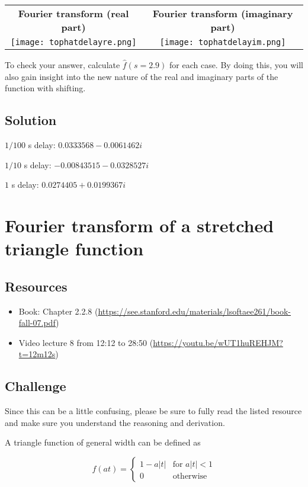\begin{tabular}{cc}
    \textbf{Fourier transform (real part)} & \textbf{Fourier transform (imaginary part)}\\
    \texttt{[image: tophatdelayre.png]} & \texttt{[image: tophatdelayim.png]}
\end{tabular}

To check your answer, calculate $\hat{f}(s=2.9)$ for each case. By doing this, you will also gain insight into the new nature of the real and imaginary parts of the function with shifting.

\subsection*{Solution}
$1/100$ s delay: $0.0333568 - 0.0061462i$

$1/10$ s delay: $-0.00843515 - 0.0328527i$

$1$ s delay: $0.0274405 + 0.0199367i$




\newpage
\section{Fourier transform of a stretched triangle function}

\subsection*{Resources}
\begin{itemize}
    \item Book: Chapter 2.2.8 (\url{https://see.stanford.edu/materials/lsoftaee261/book-fall-07.pdf})
    \item Video lecture 8 from 12:12 to 28:50 (\url{https://youtu.be/wUT1huREHJM?t=12m12s})
\end{itemize}

\subsection*{Challenge}
Since this can be a little confusing, please be sure to fully read the listed resource and make sure you understand the reasoning and derivation.

A triangle function of general width can be defined as

\begin{equation}
    f(at)=
    \begin{cases}
        1 - a|t| & \text{for } a|t| < 1\\
        0 & \text{otherwise}
    \end{cases}
\end{equation}

